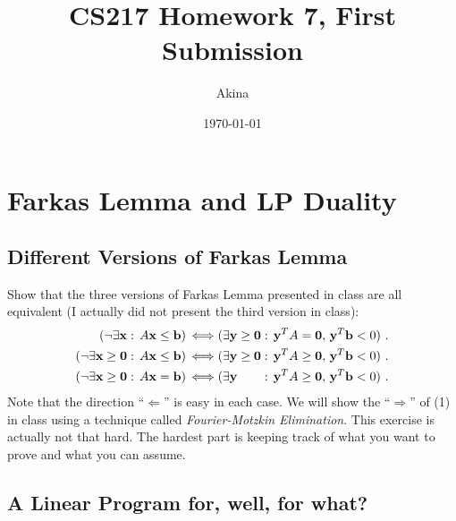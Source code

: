 \documentclass[11pt,a4paper,oneside]{article}
\newcommand{\y}{\mathbf{y}}
\newcommand{\x}{\mathbf{x}}
\renewcommand{\b}{\mathbf{b}}
\newcommand{\zero}{\mathbf{0}}
\renewcommand{\hwtitle} {CS217 Homework 7, First Submission}
\renewcommand{\hwauthor}{Akina}
\renewcommand{\hwdate}{\today}
\begin{document}
\title{\hwtitle}
\author{\hwauthor}
\date{\hwdate}
\maketitle


\section{Farkas Lemma and LP Duality}

\subsection{Different Versions of Farkas Lemma}

\begin{problem}{1}
	\statement
 Show that the three versions of Farkas Lemma presented in class are all equivalent (I actually did not present
 the third version in class):
 \begin{align}
   ( \neg \exists \x : \, A \x \leq \b ) \, & \Longleftrightarrow 
    ( \exists \y \geq \zero : \, \y^T A = \zero, \,     \y^T \b < 0 ) \ . \\
      ( \neg \exists \x \geq \zero : \, A \x \leq \b ) \, & \Longleftrightarrow 
    ( \exists \y \geq \zero : \, \y^T A \geq \zero, \,  \y^T \b < 0 ) \ . \\
   ( \neg \exists \x \geq \zero : \, A \x = \b ) \, & \Longleftrightarrow 
    ( \exists \y \begingroup \color{white} \geq \zero \endgroup : \, \y^T A \geq \zero, \,  \y^T \b < 0 ) \ .
 \end{align}
  Note that the direction ``$\Longleftarrow$'' is easy in each case. 
  We will show the ``$\Longrightarrow$'' of (1) in class using a technique called {\em Fourier-Motzkin Elimination}. 
  This exercise is actually not that hard. The hardest part is keeping track of what you 
  want to prove and what you can assume.
    
    \solution
	
\end{problem}

\subsection{A Linear Program for, well, for what?}
\end{document}
